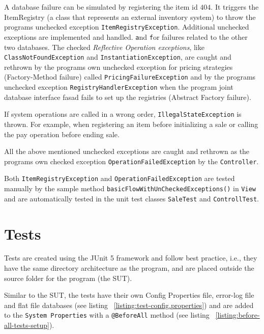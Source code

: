 \documentclass[a4paper]{scrreprt}
\begin{document}
A database failure can be simulated by registering the item id $404$.
It triggers the ItemRegistry (a class that represents an external inventory system)
to throw the programs unchecked exception \texttt{ItemRegistryException}.
Additional unchecked exceptions are implemented and handled.
\texttt and \texttt for
failures related to the other two databases.
The checked \emph{Reflective Operation exceptions}, like
\texttt{ClassNotFoundException}
and \texttt{InstantiationException},
are caught and rethrown
by the programs own unchecked exception for pricing strategies
(Factory-Method failure) called
\texttt{PricingFailureException} and by
the programs unchecked exception \texttt{RegistryHandlerException}
when the program joint database interface fasad fails to set up the registries
(Abstract Factory failure).

If system operations are called in a wrong order,
\texttt{IllegalStateException} is thrown.
For example, when registering an item before initializing a sale
or calling the pay operation before ending sale.

All the above mentioned unchecked exceptions %
are caught and rethrown as the programs own checked
exception \texttt{OperationFailedException}
by the \verb|Controller|.

Both \texttt{ItemRegistryException} and \texttt{OperationFailedException}
are tested manually
by the sample method \texttt{basicFlowWithUnCheckedExceptions()}
in \verb|View| and are automatically tested in the unit test
classes \verb|SaleTest| and \verb|ControllTest|.



\section*{Tests}
Tests are created using the JUnit 5 framework and follow best practice, i.e., they
have the same directory architecture as the program, and are placed outside the source
folder for the program (the SUT).

Similar to the SUT, the tests have their own Config Properties file, error-log file and flat file databases
(see listing ~\ref{listing:test-config.properties}) and are added to the \verb|System Properties| with
a \texttt{@BeforeAll} method (see listing ~\ref{listing:before-all-tests-setup}).
\end{document}
